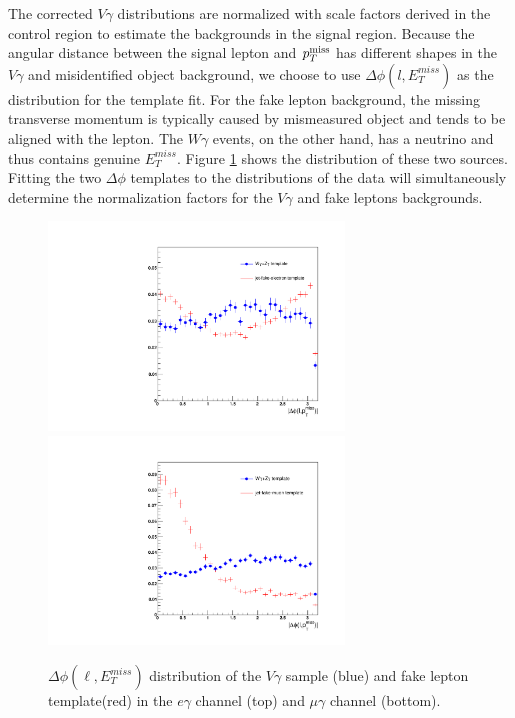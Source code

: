 \documentclass[thesis.tex]{subfiles}
\renewcommand\_{\textunderscore\allowbreak}
\begin{document}
The corrected $V\gamma$ distributions are normalized with scale factors derived in the control region to estimate the backgrounds in the signal region. 
Because the angular distance between the signal lepton and $p_T^\textrm{miss}$ has different shapes in the $V\gamma$ and misidentified object background, we choose to use $\Delta\phi(l,E_{T}^{miss})$ as the distribution for the template fit. For the fake lepton background, the missing transverse momentum is typically caused by mismeasured object and tends to be aligned with the lepton. The $W\gamma$ events, on the other hand, has a neutrino and thus contains genuine $E_{T}^{miss}$. Figure \ref{fig:dphitemplate} shows the distribution of these two sources. Fitting the two $\Delta\phi$ templates to the distributions of the data will simultaneously determine the normalization factors for the $V\gamma$ and fake leptons backgrounds. 

\begin{figure}[hbtp]
    \begin{center}
    \includegraphics[width=0.7\textwidth]{Figures/dphiTemplate_eg.pdf} \\
    \includegraphics[width=0.7\textwidth]{Figures/dphiTemplate_mg.pdf}
    \end{center}
  \caption{$\Delta\phi\left(\ell,E_{T}^{miss}\right)$ distribution of the $V\gamma$ sample (blue) and fake lepton template(red) in the $e\gamma$ channel (top) and $\mu\gamma$ channel (bottom). }
    \label{fig:dphitemplate}
\end{figure}
\end{document}
